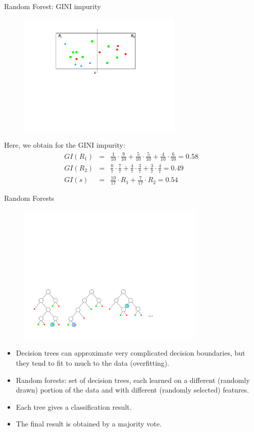 \documentclass[xcolor=pdftex,dvipsnames,table]{beamer}
\begin{document}
\begin{frame}{Random Forest: GINI impurity}
\begin{figure}[htb]
\includegraphics[width=0.7\textwidth]{../graphics/RF_GINI.pdf}
\end{figure}
Here, we obtain for the GINI impurity:
\begin{eqnarray*}
GI(R_1) &=&  \frac{1}{10} \cdot \frac{9}{10} + \frac{5}{10} \cdot \frac{5}{10} + \frac{4}{10} \cdot \frac{6}{10} = 0.58 \\
GI(R_2) &=&  \frac{0}{7}\cdot \frac{7}{7} + \frac{4}{7} \cdot \frac{3}{7} + \frac{3}{7} \cdot \frac{4}{7} = 0.49 \\
GI(s) &=&  \frac{10}{17}\cdot R_1 + \frac{7}{17}\cdot R_2 = 0.54
\end{eqnarray*}
\end{frame}

\begin{frame}{Random Forests}
\begin{figure}[htb]
\includegraphics[width=0.8\textwidth]{../graphics/Forest.pdf}
\end{figure}
\begin{itemize}
	\item Decision trees can approximate very complicated decision boundaries, but they tend to fit to much to the data (overfitting). 
	\item Random forests: set of decision trees, each learned on a different (randomly drawn) portion of the data and with different (randomly selected) features. 
	\item Each tree gives a classification result. 
	\item The final result is obtained by a majority vote. 
\end{itemize}
\end{frame}
\end{document}
